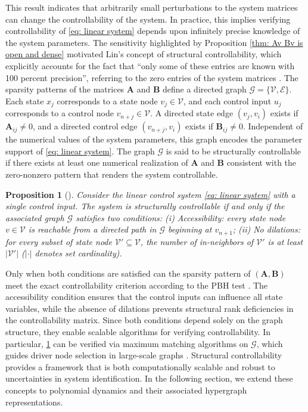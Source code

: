 \documentclass[journal,twoside,web]{ieeecolor}
\newtheorem{proposition}{Proposition}
\newcommand{\Gs}{\mathcal{G}}
\newcommand{\Vs}{\mathcal{V}}
\begin{document}
This result indicates that arbitrarily small perturbations to the system matrices can change the controllability of the system.
%
In practice, this implies verifying controllability of \eqref{eq: linear system} depends upon infinitely precise knowledge of the system parameters.
%
The sensitivity highlighted by Proposition \ref{thm: Av Bv is open and dense} motivated Lin’s concept of structural controllability, which explicitly accounts for the fact that ``only some of these entries are known with 100 percent precision'', referring to the zero entries of the system matrices \cite{lin1974structural}.
%
The sparsity patterns of the matrices $\textbf{A}$ and $\textbf{B}$ define a directed graph $\mathcal{G} = \{\mathcal{V}, \mathcal{E}\}$.
%
Each state  $x_j$ corresponds to a state node $v_j \in \mathcal{V}$, and each control input $u_j$ corresponds to a control node $v_{n+j} \in \Vs$.
%
A directed state edge $(v_j, v_i)$ exists if $\textbf{A}_{ij} \neq 0$, and a directed control edge $(v_{n+j}, v_i)$ exists if $\textbf{B}_{ij} \neq 0$.
%
Independent of the numerical values of the system parameters, this graph encodes the parameter support of \eqref{eq: linear system}.
%
The graph $\Gs$ is said to be structurally controllable if there exists at least one numerical realization of $\textbf{A}$ and $\textbf{B}$ consistent with the zero-nonzero pattern that renders the system controllable.



\begin{proposition}[\cite{lin1974structural}]\label{thm: lin structural controllability}
    Consider the linear control system \eqref{eq: linear system} with a single control input. The system is structurally controllable if and only if the associated graph $\mathcal{G}$ satisfies two conditions: (i) Accessibility: every state node $v \in \mathcal{V}$ is reachable from a directed path in $\mathcal{G}$ beginning at $v_{n+1}$; (ii) No dilations: for every subset of state node $\mathcal{V}' \subseteq \mathcal{V}$, the number of in-neighbors of $\mathcal{V}'$ is at least $|\mathcal{V}'|$ ($|\cdot|$ denotes set cardinality).
\end{proposition}

Only when both conditions are satisfied can the sparsity pattern of $(\textbf{A},\textbf{B})$ meet the exact controllability criterion according to the PBH test \cite{lin1974structural}.
%
The accessibility condition ensures that the control inputs can influence all state variables, while the absence of dilations prevents structural rank deficiencies in the controllability matrix.
%
Since both conditions depend solely on the graph structure, they enable scalable algorithms for verifying controllability.
%
In particular, \cref{thm: lin structural controllability} can be verified via  maximum matching algorithms on $\Gs$, which guides driver node selection in large-scale graphs \cite{liu2011controllability}.
%
Structural controllability provides a framework that is both computationally scalable and robust to uncertainties in system identification.
%
In the following section, we extend these concepts to polynomial dynamics and their associated hypergraph representations.
\end{document}
